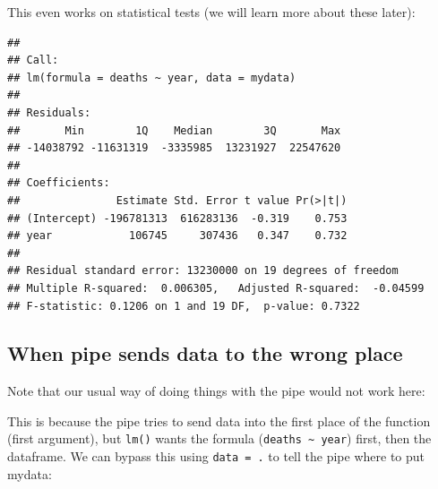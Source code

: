 \documentclass[12pt,]{krantz}
\makeatletter
\newenvironment{Shaded}{\begin{snugshade}}{\end{snugshade}}
\newcommand{\CommentTok}[1]{\textcolor[rgb]{0.56,0.35,0.01}{\textit{#1}}}
\newcommand{\DataTypeTok}[1]{\textcolor[rgb]{0.13,0.29,0.53}{#1}}
\newcommand{\KeywordTok}[1]{\textcolor[rgb]{0.13,0.29,0.53}{\textbf{#1}}}
\newcommand{\NormalTok}[1]{#1}
\newcommand{\OperatorTok}[1]{\textcolor[rgb]{0.81,0.36,0.00}{\textbf{#1}}}
\newcommand{\StringTok}[1]{\textcolor[rgb]{0.31,0.60,0.02}{#1}}
\newenvironment{kframe}{%
\medskip{}
\setlength{\fboxsep}{.8em}
 \def\at@end@of@kframe{}%
 \ifinner\ifhmode%
  \def\at@end@of@kframe{\end{minipage}}%
  \begin{minipage}{\columnwidth}%
 \fi\fi%
 \def\FrameCommand##1{\hskip\@totalleftmargin \hskip-\fboxsep
 \colorbox{shadecolor}{##1}\hskip-\fboxsep
     \hskip-\linewidth \hskip-\@totalleftmargin \hskip\columnwidth}%
 \MakeFramed {\advance\hsize-\width
   \@totalleftmargin\z@ \linewidth\hsize
   \@setminipage}}%
 {\par\unskip\endMakeFramed%
 \at@end@of@kframe}
\renewenvironment{Shaded}{\begin{kframe}}{\end{kframe}}
\theoremstyle{definition}
\theoremstyle{definition}
\theoremstyle{definition}
\theoremstyle{remark}
\makeatother
\begin{document}
This even works on statistical tests (we will learn more about these
later):

\begin{Shaded}
\end{Shaded}

\begin{verbatim}
## 
## Call:
## lm(formula = deaths ~ year, data = mydata)
## 
## Residuals:
##       Min        1Q    Median        3Q       Max 
## -14038792 -11631319  -3335985  13231927  22547620 
## 
## Coefficients:
##               Estimate Std. Error t value Pr(>|t|)
## (Intercept) -196781313  616283136  -0.319    0.753
## year            106745     307436   0.347    0.732
## 
## Residual standard error: 13230000 on 19 degrees of freedom
## Multiple R-squared:  0.006305,   Adjusted R-squared:  -0.04599 
## F-statistic: 0.1206 on 1 and 19 DF,  p-value: 0.7322
\end{verbatim}

\hypertarget{when-pipe-sends-data-to-the-wrong-place}{%
\subsection{When pipe sends data to the wrong
place}\label{when-pipe-sends-data-to-the-wrong-place}}

Note that our usual way of doing things with the pipe would not work
here:

\begin{Shaded}
\end{Shaded}

This is because the pipe tries to send data into the first place of the
function (first argument), but \texttt{lm()} wants the formula
(\texttt{deaths\ \textasciitilde{}\ year}) first, then the dataframe. We
can bypass this using \texttt{data\ =\ .} to tell the pipe where to put
mydata:
\end{document}
